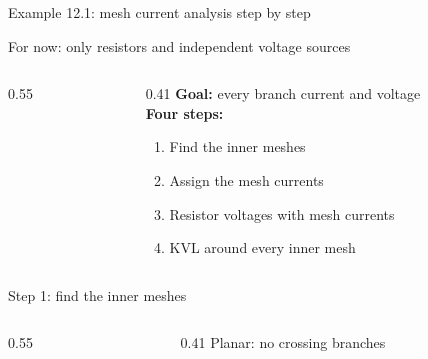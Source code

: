 \documentclass[11pt,aspectratio=169]{beamer}
\newcommand{\Icol}[1]{\textcolor{ccur}{#1}}
\newcommand{\Vcol}[1]{\textcolor{cvolt}{#1}}
\newcommand{\meshcw}[4][0.36]{%
  \draw[ccur, thick, -{Stealth[length=2mm]}] ($(#2,#3)+(150:#1)$)
    arc[start angle=150, end angle=-150, radius=#1];
  \node[mlabst] at (#2,#3) {#4};}
\newcommand{\exM}[2]{%
  \ifnum#1=0
    \draw (0,2) to[american voltage source, l_=$\Vcol{v_{s1}}$] (0,0);
    \draw (7,0) to[american voltage source, l_=$\Vcol{v_{s2}}$] (7,2);
  \else
    \draw (0,0) to[american current source, l=$\Icol{i_s}$] (0,2);
    \draw (7,0) to[american voltage source, l_=$\Vcol{v_s}$] (7,2);
  \fi
  \draw (0,2) -- (0,3.5) to[R, l=$R_4$] (7,3.5) -- (7,2);
  \draw (0,2) to[R, l=$R_1$] (3.5,2) to[R, l=$R_3$] (7,2);
  \draw (3.5,2) to[R, l=$R_2$] (3.5,0);
  \draw (0,0) -- (7,0);
  \foreach \p in {(0,2),(3.5,2),(7,2),(3.5,0)} \fill \p circle (1.7pt);
  \ifnum#2>0
    \meshcw{1.6}{1.0}{1} \meshcw{5.5}{1.0}{2} \meshcw[0.33]{3.5}{2.8}{3}
  \fi}
\begin{document}
\begin{frame}{Example 12.1: mesh current analysis step by step}
  \begin{center}
    {\small For now: only \alert{resistors} and \alert{independent voltage sources}}
  \end{center}
  \begin{columns}[c,onlytextwidth]
    \begin{column}{0.55\textwidth}
      \centering
    \end{column}
    \begin{column}{0.41\textwidth}
      \textbf{Goal:} every branch current and voltage\\[12pt]
      \textbf{Four steps:}
      \begin{enumerate}\itemsep4pt
        \item Find the inner meshes
        \item Assign the mesh currents
        \item Resistor voltages with mesh currents
        \item KVL around every inner mesh
      \end{enumerate}
    \end{column}
  \end{columns}
\end{frame}

\begin{frame}{Step 1: find the inner meshes}
  \begin{columns}[c,onlytextwidth]
    \begin{column}{0.55\textwidth}
      \centering
    \end{column}
    \begin{column}{0.41\textwidth}
      \alert{Planar}: no crossing branches\\[12pt]
    \end{column}
  \end{columns}
\end{frame}
\end{document}
